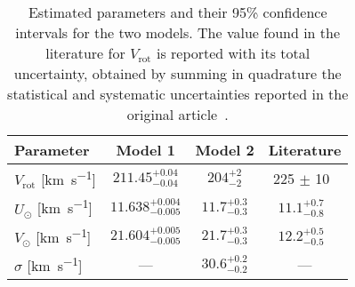 \begin{table}[H]
    \centering

    \begin{tabular}{l c c | c}
        \hline
        Parameter & Model 1 & Model 2 & Literature\\
        \hline
        $V_{\text{rot}}$ [\unit{\kilo\meter\per\second}] & $211.45_{-0.04}^{+0.04}$ & $204_{-2}^{+2}$ & 225 $\pm$ 10~\cite{GalacticKinematics} \\
        $U_{\odot}$ [\unit{\kilo\meter\per\second}] & $11.638_{-0.005}^{+0.004}$ & $11.7_{-0.3}^{+0.3}$ & $11.1_{-0.8}^{+0.7}$~\cite{LocalKinematics} \\
        $V_{\odot}$ [\unit{\kilo\meter\per\second}] & $21.604_{-0.005}^{+0.005}$ & $21.7_{-0.3}^{+0.3}$ & $12.2^{+0.5}
        _{-0.5}$~\cite{LocalKinematics} \\
        $\sigma$ [\unit{\kilo\meter\per\second}] & --- & $30.6_{-0.2}^{+0.2}$ & --- \\
        \hline
    \end{tabular}
    \caption{Estimated parameters and their 95\% confidence intervals for the two models. The value found in the literature for $V_{\text{rot}}$ is reported with its total uncertainty, obtained by summing in quadrature the statistical and systematic uncertainties reported in the original article~\cite{GalacticKinematics}.}
    \label{tab:parameter_estimates}
\end{table}

